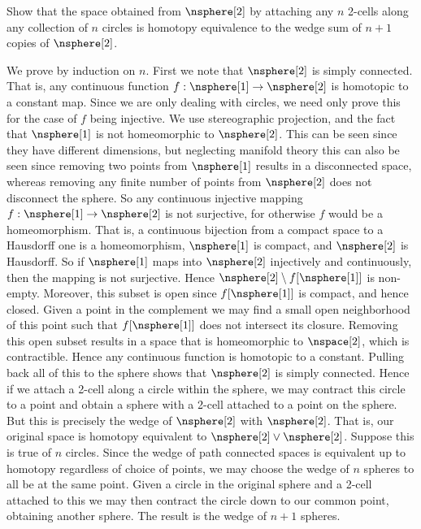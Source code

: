 \documentclass{book}                                                           %
\begin{document}
        \begin{problem}
            Show that the space obtained from $\nsphere[2]$ by attaching any $n$
            2-cells along any collection of $n$ circles is homotopy equivalence to
            the wedge sum of $n+1$ copies of $\nsphere[2]$.
        \end{problem}
        \begin{solution}
            We prove by induction on $n$. First we note that $\nsphere[2]$ is
            simply connected. That is, any continuous function
            $f:\nsphere[1]\rightarrow\nsphere[2]$ is homotopic to a constant map.
            Since we are only dealing with circles, we need only prove this for the
            case of $f$ being injective. We use stereographic projection, and the
            fact that $\nsphere[1]$ is not homeomorphic to $\nsphere[2]$. This can
            be seen since they have different dimensions, but neglecting manifold
            theory this can also be seen since removing two points from
            $\nsphere[1]$ results in a disconnected space, whereas removing any
            finite number of points from
            $\nsphere[2]$ does not disconnect the sphere. So any continuous
            injective mapping $f:\nsphere[1]\rightarrow\nsphere[2]$ is not
            surjective, for otherwise $f$ would be a homeomorphism. That is, a
            continuous bijection from a compact space to a Hausdorff one is a
            homeomorphism, $\nsphere[1]$ is compact, and $\nsphere[2]$ is Hausdorff.
            So if $\nsphere[1]$ maps into $\nsphere[2]$ injectively and
            continuously, then the mapping is not surjective. Hence
            $\nsphere[2]\setminus{f}[\nsphere[1]]$ is non-empty. Moreover, this
            subset is open since $f[\nsphere[1]]$ is compact, and hence closed.
            Given a point in the complement we may find a small open neighborhood of
            this point such that $f[\nsphere[1]]$ does not intersect its closure.
            Removing this open subset results in a space that is homeomorphic to
            $\nspace[2]$, which is contractible. Hence any continuous function is
            homotopic to a constant. Pulling back all of this to the sphere shows
            that $\nsphere[2]$ is simply connected. Hence if we attach a 2-cell
            along a circle within the sphere, we may contract this circle to a point
            and obtain a sphere with a 2-cell attached to a point on the sphere.
            But this is precisely the wedge of $\nsphere[2]$ with $\nsphere[2]$.
            That is, our original space is homotopy equivalent to
            $\nsphere[2]\lor\nsphere[2]$. Suppose this is true of $n$ circles.
            Since the wedge of path connected spaces is equivalent up to homotopy
            regardless of choice of points, we may choose the wedge of $n$ spheres
            to all be at the same point. Given a circle in the original sphere and a
            2-cell attached to this we may then contract the circle down to our
            common point, obtaining another sphere. The result is the wedge of $n+1$
            spheres.
        \end{solution}
\end{document}
